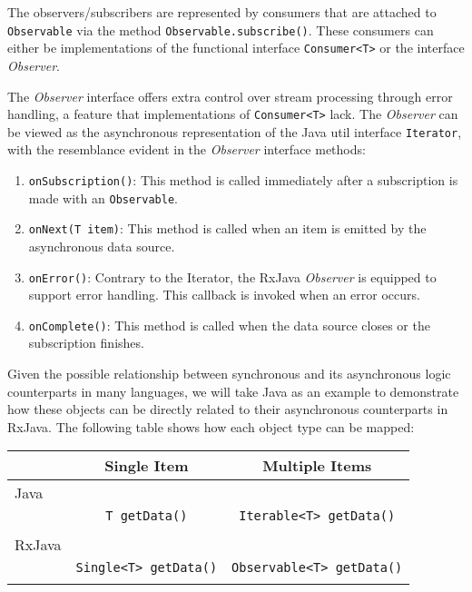 The observers/subscribers are represented by consumers that are attached to \texttt{Observable} via the method \texttt{Observable.subscribe()}. These consumers can either be implementations of the functional interface \texttt{Consumer<T>} or the interface \textit{Observer}.

The \textit{Observer} interface offers extra control over stream processing through error handling, a feature that implementations of \texttt{Consumer<T>} lack. The \textit{Observer} can be viewed as the asynchronous representation of the Java util interface \texttt{Iterator}, with the resemblance evident in the \textit{Observer} interface methods:

\begin{enumerate}
    \item \texttt{onSubscription()}: This method is called immediately after a subscription is made with an \texttt{Observable}.
    \item \texttt{onNext(T item)}: This method is called when an item is emitted by the asynchronous data source.
    \item \texttt{onError()}: Contrary to the Iterator, the RxJava \textit{Observer} is equipped to support error handling. This callback is invoked when an error occurs.
    \item \texttt{onComplete()}: This method is called when the data source closes or the subscription finishes.
\end{enumerate}

Given the possible relationship between synchronous and its asynchronous logic counterparts in many languages, we will take Java as an example to demonstrate how these objects can be directly related to their asynchronous counterparts in RxJava. The following table shows how each object type can be mapped:


\begin{center}
\begin{tabular}{ |l|c|c| }
\hline
	& Single Item & Multiple Items \\ \hline
	Java & & \\ 
& \texttt{T getData()}  & \texttt{Iterable<T> getData()} \\
	& & \\
	\hline
	RxJava & & \\ 
& \texttt{Single<T> getData()} & \texttt{Observable<T> getData()} \\
	& & \\
	\hline
\end{tabular}
\end{center}

